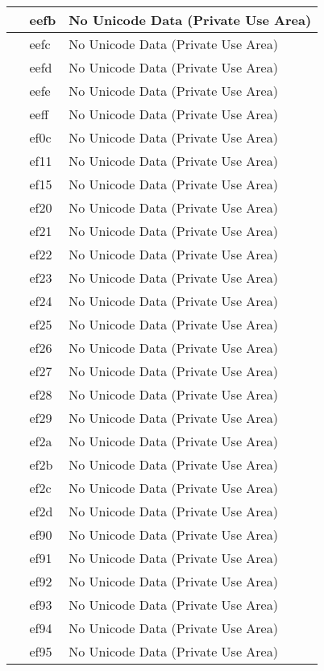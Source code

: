 \documentclass[12pt,letterpaper,openany]{book}
\begin{document}
\begin{center}
\begin{supertabular}{|m{0.25in}|m{0.5in}|m{4in}|}
 & eefb & No Unicode Data (Private Use Area)\\\hline
 & eefc & No Unicode Data (Private Use Area)\\\hline
 & eefd & No Unicode Data (Private Use Area)\\\hline
 & eefe & No Unicode Data (Private Use Area)\\\hline
 & eeff & No Unicode Data (Private Use Area)\\\hline
 & ef0c & No Unicode Data (Private Use Area)\\\hline
 & ef11 & No Unicode Data (Private Use Area)\\\hline
 & ef15 & No Unicode Data (Private Use Area)\\\hline
 & ef20 & No Unicode Data (Private Use Area)\\\hline
 & ef21 & No Unicode Data (Private Use Area)\\\hline
 & ef22 & No Unicode Data (Private Use Area)\\\hline
 & ef23 & No Unicode Data (Private Use Area)\\\hline
 & ef24 & No Unicode Data (Private Use Area)\\\hline
 & ef25 & No Unicode Data (Private Use Area)\\\hline
 & ef26 & No Unicode Data (Private Use Area)\\\hline
 & ef27 & No Unicode Data (Private Use Area)\\\hline
 & ef28 & No Unicode Data (Private Use Area)\\\hline
 & ef29 & No Unicode Data (Private Use Area)\\\hline
 & ef2a & No Unicode Data (Private Use Area)\\\hline
 & ef2b & No Unicode Data (Private Use Area)\\\hline
 & ef2c & No Unicode Data (Private Use Area)\\\hline
 & ef2d & No Unicode Data (Private Use Area)\\\hline
 & ef90 & No Unicode Data (Private Use Area)\\\hline
 & ef91 & No Unicode Data (Private Use Area)\\\hline
 & ef92 & No Unicode Data (Private Use Area)\\\hline
 & ef93 & No Unicode Data (Private Use Area)\\\hline
 & ef94 & No Unicode Data (Private Use Area)\\\hline
 & ef95 & No Unicode Data (Private Use Area)\\\hline

\end{supertabular}
\end{center}
\end{document}
